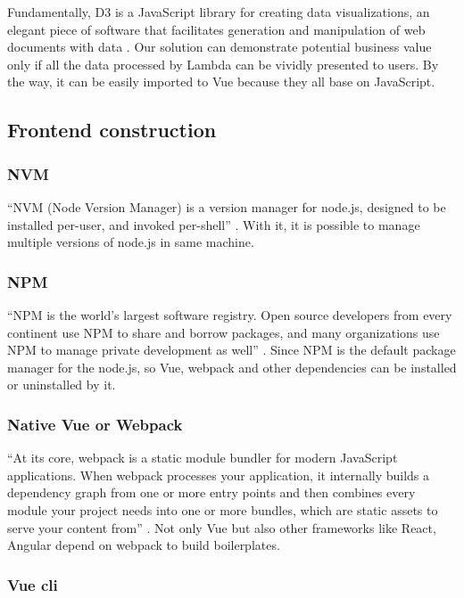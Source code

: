 \documentclass[conference]{IEEEtran}
\begin{document}
Fundamentally, D3 is a JavaScript library for creating data visualizations, an elegant piece of software that facilitates 
generation and manipulation of web documents with data \cite{2013Interactive}. Our solution can demonstrate potential business 
value only if all the data processed by Lambda can be vividly presented to users. By the way, it can be easily imported to 
Vue because they all base on JavaScript.
 
\subsection{Frontend construction}

\subsubsection{NVM}
	
“NVM (Node Version Manager) is a version manager for node.js, designed to be installed per-user, and invoked per-shell” 
\cite{nvmshnvm87:online}. With it, it is possible to manage multiple versions of node.js in same machine.

\subsubsection{NPM}

“NPM is the world's largest software registry. Open source developers from every continent use NPM to share and borrow packages, 
and many organizations use NPM to manage private development as well” \cite{Aboutnpm31:online}. Since NPM is the default package manager for the 
node.js, so Vue, webpack and other dependencies can be installed or uninstalled by it.

\subsubsection{Native Vue or Webpack}

“At its core, webpack is a static module bundler for modern JavaScript applications. When webpack processes your application, it 
internally builds a dependency graph from one or more entry points and then combines every module your project needs into one or 
more bundles, which are static assets to serve your content from” \cite{Concepts28:online}. Not only Vue but also other frameworks like React, 
Angular depend on webpack to build boilerplates.

\subsubsection{Vue cli}
\end{document}

